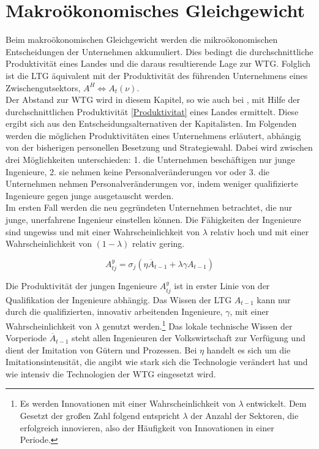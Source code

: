 \section[Makroökonomisches Gleichgewicht]{Makroökonomisches Gleichgewicht}\label{sec:makro GG}
Beim makroökonomischen Gleichgewicht werden die mikroökonomischen Entscheidungen der Unternehmen akkumuliert. Dies bedingt die durchschnittliche Produktivität eines Landes und die daraus resultierende Lage zur WTG. Folglich ist die LTG äquivalent mit der Produktivität des führenden Unternehmens eines Zwischengutsektors, $A^H \Leftrightarrow A_t(\nu)$.\\
Der Abstand zur WTG wird in diesem Kapitel, so wie auch bei \citet{Acemoglu.2006}, mit Hilfe der durchschnittlichen Produktivität \eqref{Produktivitat} eines Landes ermittelt.
Diese ergibt sich aus den Entscheidungsalternativen der Kapitalisten. Im Folgenden werden die möglichen Produktivitäten eines Unternehmens erläutert, abhängig von der bisherigen personellen Besetzung und Strategiewahl. Dabei wird zwischen drei Möglichkeiten unterschieden: 1. die Unternehmen beschäftigen nur junge Ingenieure, 2. sie nehmen keine Personalveränderungen vor oder 3. die Unternehmen nehmen Personalveränderungen vor, indem weniger qualifizierte Ingenieure gegen junge ausgetauscht werden.\\
Im ersten Fall werden die neu gegründeten Unternehmen betrachtet, die nur junge, unerfahrene Ingenieur einstellen können. Die Fähigkeiten der Ingenieure sind ungewiss und mit einer Wahrscheinlichkeit von $\lambda$ relativ hoch und mit einer Wahrscheinlichkeit von $(1-\lambda)$ relativ gering.


	\begin{equation}
		A_{tj}^{y}=\sigma_j(\eta\overline{A}_{t-1}+\lambda\gamma A_{t-1})\label{Produktivitat jung}
	\end{equation}


Die Produktivität der jungen Ingenieure $A_{tj}^{y}$ ist in erster Linie von der Qualifikation der Ingenieure abhängig. Das Wissen der LTG $A_{t-1}$ kann nur durch die qualifizierten, innovativ arbeitenden Ingenieure, $\gamma$, mit einer Wahrscheinlichkeit von $\lambda$ genutzt werden.\footnote{Es werden Innovationen mit einer Wahrscheinlichkeit von $\lambda$ entwickelt. Dem Gesetzt der gro{\ss}en Zahl folgend entspricht $\lambda$ der Anzahl der Sektoren, die erfolgreich innovieren, also der Häufigkeit von Innovationen in einer Periode.} Das lokale technische Wissen der Vorperiode $\overline{A}_{t-1}$ steht allen Ingenieuren der Volkswirtschaft zur Verfügung und dient der Imitation von Gütern und Prozessen. Bei $\eta$ handelt es sich um die Imitationsintensität, die angibt wie stark sich die Technologie verändert hat und wie intensiv die Technologien der WTG eingesetzt wird.\\


